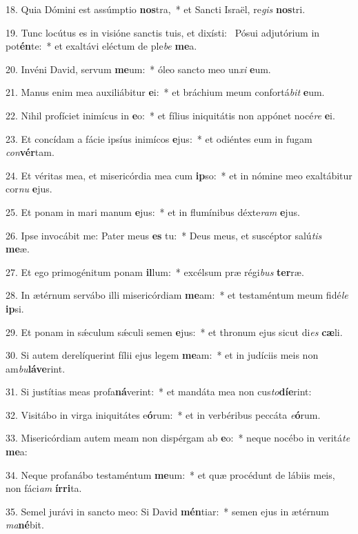 18. Quia Dómini est assúmptio \textbf{nos}tra,~*  et Sancti Israël, re\textit{gis} \textbf{nos}tri.\

19. Tunc locútus es in visióne sanctis tuis, et dixísti: \dag\  Pósui adjutórium in pot\textbf{én}te:~*  et exaltávi eléctum de ple\textit{be} \textbf{me}a.\

20. Invéni David, servum \textbf{me}um:~*  óleo sancto meo un\textit{xi} \textbf{e}um.\

21. Manus enim mea auxiliábitur \textbf{e}i:~*  et bráchium meum confortá\textit{bit} \textbf{e}um.\

22. Nihil profíciet inimícus in \textbf{e}o:~*  et fílius iniquitátis non appónet nocé\textit{re} \textbf{e}i.\

23. Et concídam a fácie ipsíus inimícos \textbf{e}jus:~*  et odiéntes eum in fugam \textit{con}\textbf{vér}tam.\

24. Et véritas mea, et misericórdia mea cum \textbf{ip}so:~*  et in nómine meo exaltábitur cor\textit{nu} \textbf{e}jus.\

25. Et ponam in mari manum \textbf{e}jus:~*  et in flumínibus déxte\textit{ram} \textbf{e}jus.\

26. Ipse invocábit me: Pater meus \textbf{es} tu:~*  Deus meus, et suscéptor salú\textit{tis} \textbf{me}æ.\

27. Et ego primogénitum ponam \textbf{il}lum:~*  excélsum præ régi\textit{bus} \textbf{ter}ræ.\

28. In ætérnum servábo illi misericórdiam \textbf{me}am:~*  et testaméntum meum fidé\textit{le} \textbf{ip}si.\

29. Et ponam in sǽculum sǽculi semen \textbf{e}jus:~*  et thronum ejus sicut di\textit{es} \textbf{cæ}li.\

30. Si autem derelíquerint fílii ejus legem \textbf{me}am:~*  et in judíciis meis non am\textit{bu}\textbf{lá}\textbf{ve}rint.\

31. Si justítias meas profa\textbf{ná}verint:~*  et mandáta mea non cus\textit{to}\textbf{dí}\textbf{e}rint:\

32. Visitábo in virga iniquitátes e\textbf{ó}rum:~*  et in verbéribus peccáta \textit{e}\textbf{ó}rum.\

33. Misericórdiam autem meam non dispérgam ab \textbf{e}o:~*  neque nocébo in veritá\textit{te} \textbf{me}a:\

34. Neque profanábo testaméntum \textbf{me}um:~*  et quæ procédunt de lábiis meis, non fáci\textit{am} \textbf{ír}\textbf{ri}ta.\

35. Semel jurávi in sancto meo: Si David \textbf{mén}tiar:~*  semen ejus in ætérnum \textit{ma}\textbf{né}bit.\

